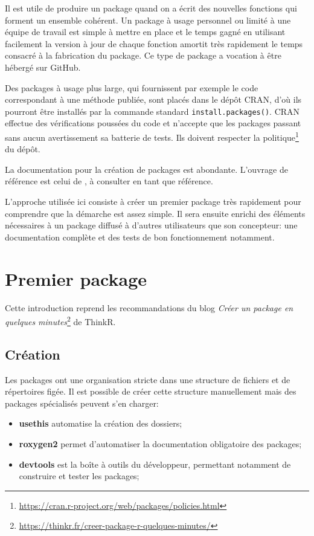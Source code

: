 \documentclass[
  12pt,
  french,
  a4paper,
  extrafontsizes,onecolumn,openright
  ]{memoir}
\providecommand{\tightlist}{%
  \setlength{\itemsep}{0pt}\setlength{\parskip}{0pt}}
\begin{document}
Il est utile de produire un package quand on a écrit des nouvelles fonctions qui forment un ensemble cohérent.
Un package à usage personnel ou limité à une équipe de travail est simple à mettre en place et le temps gagné en utilisant facilement la version à jour de chaque fonction amortit très rapidement le temps consacré à la fabrication du package.
Ce type de package a vocation à être hébergé sur GitHub.

Des packages à usage plus large, qui fournissent par exemple le code correspondant à une méthode publiée, sont placés dans le dépôt CRAN, d'où ils pourront être installés par la commande standard \texttt{install.packages()}.
CRAN effectue des vérifications poussées du code et n'accepte que les packages passant sans aucun avertissement sa batterie de tests.
Ils doivent respecter la politique\footnote{\url{https://cran.r-project.org/web/packages/policies.html}} du dépôt.

La documentation pour la création de packages est abondante.
L'ouvrage de référence est celui de \textcite{Wickham2015}, à consulter en tant que référence.

L'approche utilisée ici consiste à créer un premier package très rapidement pour comprendre que la démarche est assez simple.
Il sera ensuite enrichi des éléments nécessaires à un package diffusé à d'autres utilisateurs que son concepteur: une documentation complète et des tests de bon fonctionnement notamment.

\hypertarget{premier-package}{%
\section{Premier package}\label{premier-package}}

Cette introduction reprend les recommandations du blog \emph{Créer un package en quelques minutes}\footnote{\url{https://thinkr.fr/creer-package-r-quelques-minutes/}} de ThinkR.

\hypertarget{cruxe9ation}{%
\subsection{Création}\label{cruxe9ation}}

Les packages ont une organisation stricte dans une structure de fichiers et de répertoires figée.
Il est possible de créer cette structure manuellement mais des packages spécialisés peuvent s'en charger:

\begin{itemize}
\tightlist
\item
  \textbf{usethis} automatise la création des dossiers;
\item
  \textbf{roxygen2} permet d'automatiser la documentation obligatoire des packages;
\item
  \textbf{devtools} est la boîte à outils du développeur, permettant notamment de construire et tester les packages;
\end{itemize}
\end{document}
